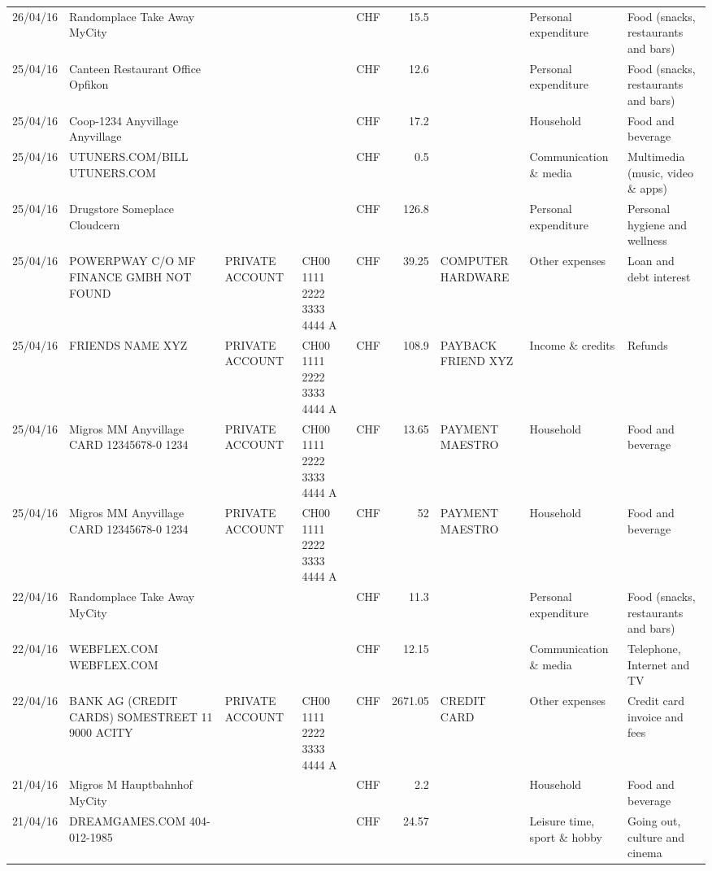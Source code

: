 \begin{landscape}
\begin{table}[h]
\begin{center}
\begin{tabular}{rllllrlll}
		26/04/16 & Randomplace Take Away     MyCity &       &       & CHF   & 15.5  &       & Personal expenditure & Food (snacks, restaurants and bars) \\
		25/04/16 & Canteen Restaurant Office      Opfikon &       &       & CHF   & 12.6  &       & Personal expenditure & Food (snacks, restaurants and bars) \\
		25/04/16 & Coop-1234 Anyvillage    Anyvillage &       &       & CHF   & 17.2  &       & Household & Food and beverage \\
		25/04/16 & UTUNERS.COM/BILL          UTUNERS.COM &       &       & CHF   & 0.5   &       & Communication \& media & Multimedia (music, video \& apps) \\
		25/04/16 & Drugstore Someplace      Cloudcern &       &       & CHF   & 126.8 &       & Personal expenditure & Personal hygiene and wellness \\
		25/04/16 & POWERPWAY C/O MF FINANCE GMBH NOT FOUND & PRIVATE ACCOUNT & CH00 1111 2222 3333 4444 A & CHF   & 39.25 & COMPUTER HARDWARE & Other expenses & Loan and debt interest \\
		25/04/16 & FRIENDS NAME XYZ & PRIVATE ACCOUNT & CH00 1111 2222 3333 4444 A & CHF   & 108.9 & PAYBACK FRIEND XYZ & Income \& credits & Refunds \\
		25/04/16 & Migros MM Anyvillage CARD 12345678-0 1234 & PRIVATE ACCOUNT & CH00 1111 2222 3333 4444 A & CHF   & 13.65 & PAYMENT MAESTRO & Household & Food and beverage \\
		25/04/16 & Migros MM Anyvillage CARD 12345678-0 1234 & PRIVATE ACCOUNT & CH00 1111 2222 3333 4444 A & CHF   & 52    & PAYMENT MAESTRO & Household & Food and beverage \\
		22/04/16 & Randomplace Take Away     MyCity &       &       & CHF   & 11.3  &       & Personal expenditure & Food (snacks, restaurants and bars) \\
		22/04/16 & WEBFLEX.COM              WEBFLEX.COM &       &       & CHF   & 12.15 &       & Communication \& media & Telephone,  Internet and TV \\
		22/04/16 & BANK AG (CREDIT CARDS) SOMESTREET 11 9000 ACITY & PRIVATE ACCOUNT & CH00 1111 2222 3333 4444 A & CHF   & 2671.05 & CREDIT CARD & Other expenses & Credit card invoice and fees \\
		21/04/16 & Migros M Hauptbahnhof    MyCity &       &       & CHF   & 2.2   &       & Household & Food and beverage \\
		21/04/16 & DREAMGAMES.COM           404-012-1985 &       &       & CHF   & 24.57 &       & Leisure time, sport \& hobby & Going out, culture and cinema \\

\end{tabular}
\end{center}
\end{table}
\end{landscape}
